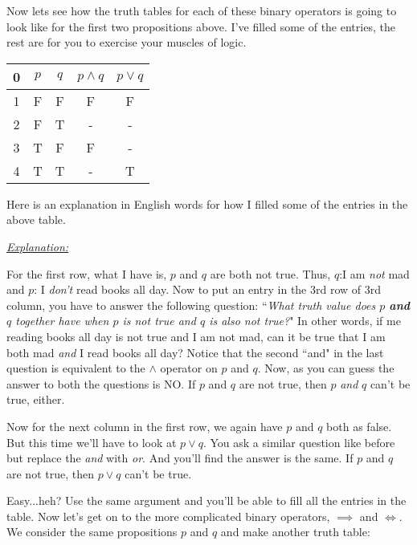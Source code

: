 \documentclass{article}
\begin{document}
Now lets see how the truth tables for each of these binary operators is going to look like for the first two propositions above. I've filled some of the entries, the rest are for you to exercise your muscles of logic. 

\begin{center}
	\begin{tabular}{c||c|c||c|c}
		0 & $p$ & $q$ & $p \land q$ & $p \lor q$ \\
		\hline
		1 & F & F & F & F	\\
		2 & F & T & - & - 	\\	
		3 & T & F & F & -	\\	
		4 & T & T & - & T	\\
		
	\end{tabular}
\end{center}

Here is an explanation in English words for how I filled some of the entries in the above table. 

\vspace{2.5mm}
\textit{\underline{Explanation:}} \\
\vspace{2.5mm}
\noindent

For the first row, what I have is, $p$ and $q$ are both not true. Thus, $q$:I am \textit{not} mad and $p$: I \textit{don't} read books all day. Now to put an entry in the 3rd row of 3rd column, you have to answer the following question: ``\textit{What truth value does $p$ \textbf{and} $q$ together have when $p$ is not true and $q$ is also not true?}" In other words, if me reading books all day is not true and I am not mad, can it be true that I am both mad \textit{and} I read books all day? Notice that the second ``and" in the last question is equivalent to the $\land$ operator on $p$ and $q$. Now, as you can guess the answer to both the questions is NO. If $p$ and $q$ are not true, then $p$ \textit{and} $q$ can't be true, either. 

Now for the next column in the first row, we again have $p$ and $q$ both as false. But this time we'll have to look at $p \lor q$. You ask a similar question like before but replace the \textit{and} with \textit{or}. And you'll find the answer is the same. If $p$ and $q$ are not true, then $p \lor q$ can't be true. 

\vspace{2.5mm}

Easy...heh? Use the same argument and you'll be able to fill all the entries in the table. Now let's get on to the more complicated binary operators, $\implies$ and $\iff$. We consider the same propositions $p$ and $q$ and make another truth table:
\end{document}

